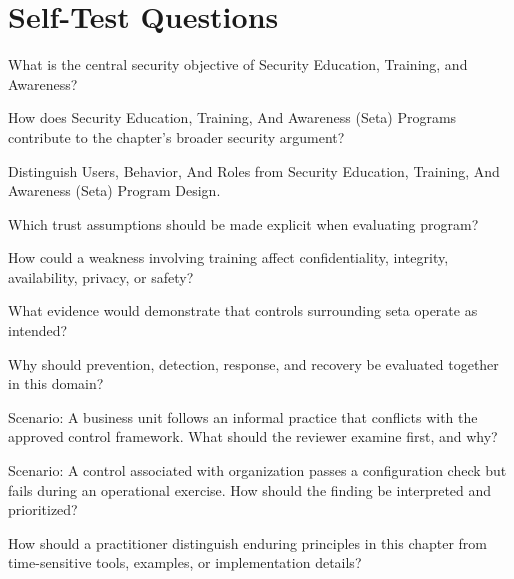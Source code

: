\documentclass[11pt,letterpaper]{article}
\begin{document}
\section*{Self-Test Questions}
\begin{CornellRecallList}
\item What is the central security objective of Security Education, Training, and Awareness?
\item How does Security Education, Training, And Awareness (Seta) Programs contribute to the chapter's broader security argument?
\item Distinguish Users, Behavior, And Roles from Security Education, Training, And Awareness (Seta) Program Design.
\item Which trust assumptions should be made explicit when evaluating program?
\item How could a weakness involving training affect confidentiality, integrity, availability, privacy, or safety?
\item What evidence would demonstrate that controls surrounding seta operate as intended?
\item Why should prevention, detection, response, and recovery be evaluated together in this domain?
\item Scenario: A business unit follows an informal practice that conflicts with the approved control framework. What should the reviewer examine first, and why?
\item Scenario: A control associated with organization passes a configuration check but fails during an operational exercise. How should the finding be interpreted and prioritized?
\item How should a practitioner distinguish enduring principles in this chapter from time-sensitive tools, examples, or implementation details?
\end{CornellRecallList}
\end{document}
